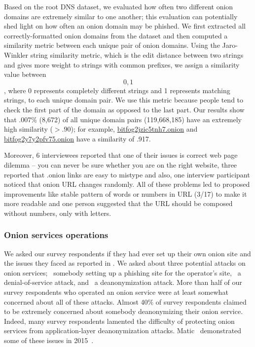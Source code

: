 Based on the root DNS dataset, we evaluated how often two 
different onion domains are extremely similar to one another; this evaluation can potentially shed 
light on how often an onion domain may be phished.  We first extracted all correctly-formatted 
onion domains from the dataset and then computed a similarity metric between each unique pair of onion 
domains.  Using the Jaro-Winkler string similarity metric, which is the edit distance between two strings and gives more weight 
to strings with common prefixes, we assign a similarity value between \[0,1\], where 0 represents completely different strings 
and 1 represents matching strings, to each unique domain pair. We use this metric because people tend to check the first part of the domain as opposed to the last part. 
Our results show that .007\% (8,672) of all unique domain pairs (119,668,185) have an extremely high similarity ($> .90$); for example, 
\url{bitfog2jzic5tnh7.onion} and \url{bitfog2y7y2pfv75.onion} have a similarity of .917.

Moreover, 6 interviewees reported that one of their issues is correct web page dilemma – you can never be sure whether you are on the right website, three reported that .onion links are easy to mistype and also, one interview participant noticed that onion URL changes randomly. All of these problems led to proposed improvements like stable pattern of words or numbers in URL (3/17) to make it more readable and one person suggested that the URL should be composed without numbers, only with letters.

\subsubsection{Onion services operations}
We asked our survey respondents if they had ever set up their own onion site and the issues they faced as reported in .  We asked about three potential attacks on onion services; \first~somebody setting up a
phishing site for the operator's site, \second~a denial-of-service attack, and
\third~a deanonymization attack.  More than half of our survey respondents who operated an onion service were at least
somewhat concerned about all of these attacks.  Almost 40\% of survey respondents claimed to be
extremely concerned about somebody deanonymizing their onion service.  Indeed,
many survey respondents lamented the difficulty of protecting onion services from
application-layer deanonymization attacks.  Matic \ea\ demonstrated some of
these issues in 2015~\cite{Matic2015a}.

